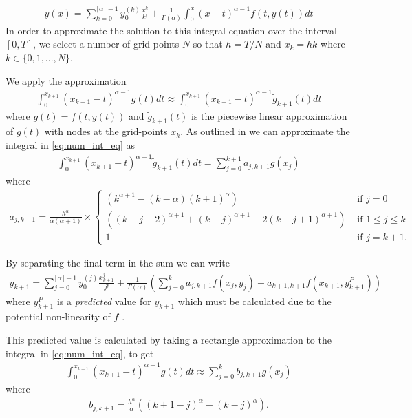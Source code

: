 \begin{align}
    \label{eq:num_int_eq}
    y(x) = \sum_{k=0}^{\lceil \alpha \rceil - 1} y_{0}^{(k)} \frac{x^k}{k!} + \frac{1}{\Gamma(\alpha)} \int_0^x (x-t)^{\alpha - 1} f(t, y(t))dt
\end{align}
In order to approximate the solution to this integral equation over the interval $ [0, T] $, we select a number of grid points $ N $ so that $ h = T / N $ and $ x_k = hk $ where $ k \in \{0, 1, ..., N\} $.

We apply the approximation
\begin{align}
    \int_0^{x_{k+1}} (x_{k+1} - t)^{\alpha - 1} g(t)dt \approx \int_0^{x_{k+1}} (x_{k+1} - t)^{\alpha - 1} \tilde{g}_{k+1}(t)dt
\end{align}
where $ g(t) = f(t, y(t)) $ and $ \tilde{g}_{k+1}(t) $ is the piecewise linear approximation of $ g(t) $ with nodes at the grid-points $ x_k $. As outlined in \cite{Diethelm2004} we can approximate the integral in \eqref{eq:num_int_eq} as
\begin{align}
    \label{eq:amb_sum_1}
    \int_{0}^{x_{k+1}} (x_{k+1} - t)^{\alpha - 1} \tilde{g}_{k+1}(t) dt = \sum_{j=0}^{k+1} a_{j,k+1}g(x_j)
\end{align}
where 
\begin{align}
    a_{j,k+1} = \frac{h^\alpha}{\alpha(\alpha+1)} \times
    \begin{cases}
        (k^{\alpha+1}-(k-\alpha)(k+1)^\alpha) & \text{ if } j = 0 \\
        ((k-j+2)^{\alpha + 1} + (k-j)^{\alpha+1} - 2(k-j+1)^{\alpha+1}) & \text{ if } 1 \leq j \leq k \\
        1 & \text{ if } j = k + 1.
    \end{cases}
\end{align}

By separating the final term in the sum we can write
\begin{align}
\label{eq:amb_y_corr}
    y_{k+1} = \sum_{j=0}^{\lceil \alpha \rceil - 1} y_{0}^{(j)} \frac{x^j_{k+1}}{j!} + \frac{1}{\Gamma(\alpha)} \left( \sum_{j=0}^k a_{j,k+1} f(x_j,y_j) + a_{k+1,k+1}f(x_{k+1}, y_{k+1}^P )\right)
\end{align}
where $ y_{k+1}^P $ is a \emph{predicted} value for $ y_{k+1} $ which must be calculated due to the potential non-linearity of $ f $ \cite{Diethelm2004}.

This predicted value is calculated by taking a rectangle approximation to the integral in \eqref{eq:num_int_eq}, to get
\begin{align}
    \label{eq:amb_sum_2}
    \int_{0}^{x_{k+1}} (x_{k+1} - t)^{\alpha - 1} g(t) dt \approx \sum_{j=0}^k b_{j,k+1}g(x_j)
\end{align}
where
\begin{align}
    b_{j,k+1} = \frac{h^\alpha}{\alpha} \left( (k+1-j)^\alpha - (k-j)^\alpha \right).
\end{align}

